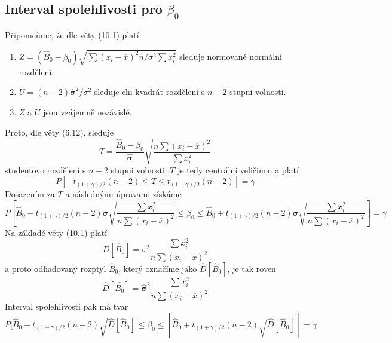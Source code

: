 \subsection{Interval spolehlivosti pro $\beta_0$}

Připomeňme, že dle věty (10.1) platí
\begin{enumerate}
\item $Z = (\hat{B}_0 - \beta_0)\sqrt{\sum (x_i - \overline{x})^2 n / \sigma^2 \sum x_i^2}$ sleduje normované normální rozdělení.
\item $U = (n - 2)\hat{\boldsymbol \sigma}^2 / \sigma^2$ sleduje chi-kvadrát rozdělení s $n - 2$ stupni volnosti.
\item $Z$ a $U$ jsou vzájemně nezávislé.
\end{enumerate}
Proto, dle věty (6.12), sleduje
\begin{equation*}
T = \frac{\hat{B}_0 - \beta_0}{\hat{\boldsymbol \sigma}}\sqrt{\frac{n \sum (x_i - \overline{x})^2}{\sum x_i^2}}
\end{equation*}
studentovo rozdělení s $n - 2$ stupni volnosti. $T$ je tedy centrální veličinou a platí
\begin{equation*}
P[-t_{(1 + \gamma)/2}(n - 2) \le T \le t_{(1 + \gamma)/2}(n - 2)] = \gamma
\end{equation*}
Dosazením za $T$ a následnými úpravami získáme
\begin{equation*}
P\left[\hat{B}_0 - t_{(1 + \gamma)/2}(n - 2)\boldsymbol \sigma \sqrt{\frac{\sum x_i^2}{n \sum (x_i - \overline{x})^2}} \le \beta_0 \le \hat{B}_0 + t_{(1 + \gamma)/2}(n - 2)\boldsymbol \sigma \sqrt{\frac{\sum x_i^2}{n \sum (x_i - \overline{x})^2}} \right] = \gamma
\end{equation*}
Na základě věty (10.1) platí
\begin{equation*}
D[\hat{B}_0] = \sigma^2 \frac{\sum x_i^2}{n \sum (x_i - \overline{x})^2}
\end{equation*}
a proto odhadovaný rozptyl $\hat{B}_0$, který označíme jako $\hat{D}[\hat{B}_0]$, je tak roven
\begin{equation*}
\hat{D}[\hat{B_0}] = \hat{\boldsymbol \sigma}^2 \frac{\sum x_i^2}{n \sum (x_i - \overline{x})^2}
\end{equation*}
Interval spolehlivosti pak má tvar
\begin{equation*}
P[\hat{B}_0 - t_{(1 + \gamma)/2}(n - 2)\sqrt{\hat{D}[\hat{B}_0]} \le \beta_0 \le [\hat{B}_0 + t_{(1 + \gamma)/2}(n - 2)\sqrt{\hat{D}[\hat{B}_0]}] = \gamma
\end{equation*}

